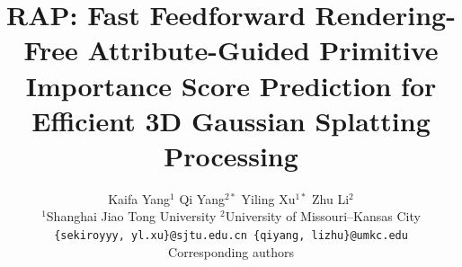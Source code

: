 \documentclass[10pt,twocolumn,letterpaper]{article}
\title{RAP: Fast Feedforward Rendering-Free Attribute-Guided Primitive Importance Score Prediction for Efficient 3D Gaussian Splatting Processing}
\author{
Kaifa Yang$^{1}$ \quad
Qi Yang$^{2*}$ \quad
Yiling Xu$^{1*}$ \quad
Zhu Li$^{2}$\\
$^{1}$Shanghai Jiao Tong University \quad
$^{2}$University of Missouri--Kansas City\\
{\tt\small \{sekiroyyy, yl.xu\}@sjtu.edu.cn \quad
\{qiyang, lizhu\}@umkc.edu}\\
{\small *Corresponding authors}
}
\begin{document}
\maketitle
    






{
    \small
    
    
}


\end{document}

